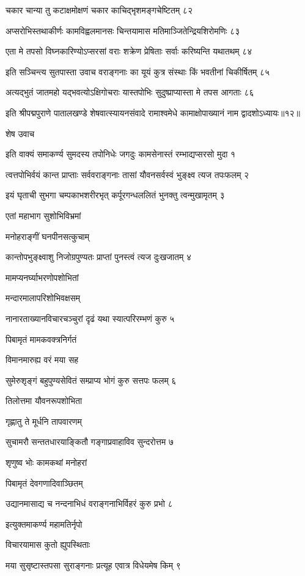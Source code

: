 चकार चान्या तु कटाक्षमोक्षणं
चकार काचिद्भृशमङ्गचेष्टितम् ८२

अप्सरोभिस्तथाकीर्णः कामविह्वलमानसः
चिन्तयामास मतिमाञ्जितेन्द्रियशिरोमणिः ८३

एता मे तपसो विघ्नकारिण्योऽप्सरसां वराः
शक्रेण प्रेषिताः सर्वाः करिष्यन्ति यथातथम् ८४

इति सञ्चिन्त्य सुतपास्ता उवाच वराङ्गनाः
का यूयं कुत्र संस्थाः किं भवतीनां चिकीर्षितम् ८५

अत्यद्भुतं जातमहो यद्भवत्योऽक्षिगोचराः
यास्तपोभिः सुदुष्प्राप्यास्ता मे तपस आगताः ८६

इति श्रीपद्मपुराणे पातालखण्डे शेषवात्स्यायनसंवादे रामाश्वमेधे कामाक्षोपाख्यानं नाम द्वादशोऽध्यायः॥१२॥


शेष उवाच

इति वाक्यं समाकर्ण्य सुमदस्य तपोनिधेः
जगदुः कामसेनास्तं रम्भाद्यप्सरसो मुदा १

त्वत्तपोभिर्वयं कान्त प्राप्ताः सर्ववराङ्गनाः
तासां यौवनसर्वस्वं भुङ्क्ष्व त्यज तपःफलम् २

इयं घृताची सुभगा चम्पकाभशरीरभृत्
कर्पूरगन्धललितं भुनक्तु त्वन्मुखामृतम् ३

एतां महाभाग सुशोभिविभ्रमां

मनोहराङ्गीं घनपीनसत्कुचाम्

कान्तोपभुङ्क्ष्वाशु निजोग्रपुण्यतः
प्राप्तां पुनस्त्वं त्यज दुःखजातम् ४

मामप्यनर्घ्याभरणोपशोभितां

मन्दारमालापरिशोभिवक्षसम्

नानारताख्यानविचारचञ्चुरां
दृढं यथा स्यात्परिरम्भणं कुरु ५

पिबामृतं मामकवक्त्रनिर्गतं

विमानमारुह्य वरं मया सह

सुमेरुशृङ्गं बहुपुण्यसेवितं
सम्प्राप्य भोगं कुरु सत्तपः फलम् ६

तिलोत्तमा यौवनरूपशोभिता

गृह्णातु ते मूर्धनि तापवारणम्

सुचामरौ सन्ततधारयाङ्कितौ
गङ्गाप्रवाहाविव सुन्दरोत्तम ७

शृणुष्व भोः कामकथां मनोहरां

पिबामृतं देवगणादिवाञ्छितम्

उद्यानमासाद्य च नन्दनाभिधं
वराङ्गनाभिर्विहरं कुरु प्रभो ८

इत्युक्तमाकर्ण्य महामतिर्नृपो

विचारयामास कुतो ह्युपस्थिताः

मया सुसृष्टास्तपसा सुराङ्गनाः
प्रत्यूह एवात्र विधेयमेष किम् ९

